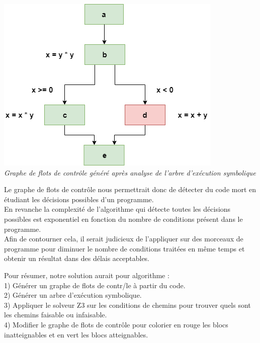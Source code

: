 \documentclass[a4paper,twoside,12pt,openright]{report}
\begin{document}
\begin{center}
\includegraphics[scale=0.8]{Image/ExempleGraphe2.png}\\
\itshape{Graphe de flots de contrôle généré après analyse de l'arbre d'exécution symbolique}
\end{center}

Le graphe de flots de contrôle nous permettrait donc de détecter du code mort en étudiant les décisions possibles d'un programme.\\
En revanche la complexité de l'algorithme qui détecte toutes les décisions possibles est exponentiel en fonction du nombre de conditions présent dans le programme.\\
Afin de contourner cela, il serait judicieux de l'appliquer sur des morceaux de programme pour diminuer le nombre de conditions traitées en même temps et obtenir un résultat dans des délais acceptables.\\

\newpage

Pour résumer, notre solution aurait pour algorithme :\\

1) Générer un graphe de flots de contr^^ole à partir du code.\\

2) Générer un arbre d'exécution symbolique.\\

3) Appliquer le solveur Z3 sur les conditions de chemins pour trouver quels sont les chemins faisable ou infaisable.\\

4) Modifier le graphe de flots de contrôle pour colorier en rouge les blocs inatteignables et en vert les blocs atteignables.\\
\end{document}
